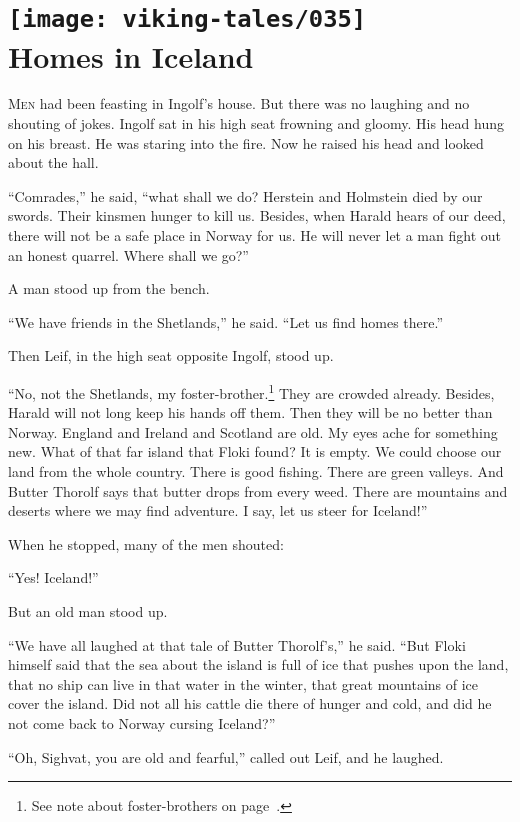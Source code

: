 \section[Homes in Iceland]{
    \texttt{[image: viking-tales/035]}\\
    Homes in Iceland}

\lettrine{M}{en} had been feasting in Ingolf's house. But there was no
laughing and no shouting of jokes. Ingolf sat in his high seat frowning
and gloomy. His head hung on his breast. He was staring into the fire.
Now he raised his head and looked about the hall.

``Comrades,'' he said, ``what shall we do? Herstein and Holmstein died
by our swords. Their kinsmen hunger to kill us. Besides, when Harald
hears of our deed, there will not be a safe place in Norway for us. He
will never let a man fight out an honest quarrel. Where shall we go?''

A man stood up from the bench.

``We have friends in the Shetlands,'' he said. ``Let us find homes
there.''

Then Leif, in the high seat opposite Ingolf, stood up.

``No, not the Shetlands, my foster-brother.\footnote{See note about
foster-brothers on page~\pageref{foster-brothers}.} They are crowded
already. Besides, Harald will not long keep his hands off them. Then they
will be no better than Norway. England and Ireland and Scotland are old.
My eyes ache for something new. What of that far island that Floki found?
It is empty. We could choose our land from the whole country. There is
good fishing. There are green valleys. And Butter Thorolf says that
butter drops from every weed. There are mountains and deserts where we
may find adventure. I say, let us steer for Iceland!''

When he stopped, many of the men shouted:

``Yes! Iceland!''

But an old man stood up.

``We have all laughed at that tale of Butter Thorolf's,'' he said. ``But
Floki himself said that the sea about the island is full of ice that
pushes upon the land, that no ship can live in that water in the winter,
that great mountains of ice cover the island. Did not all his cattle die
there of hunger and cold, and did he not come back to Norway cursing
Iceland?''

``Oh, Sighvat, you are old and fearful,'' called out Leif, and he
laughed.

